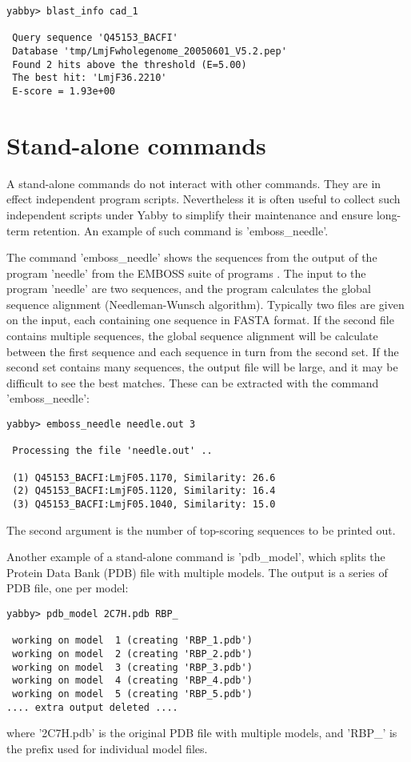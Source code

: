 \begin{verbatim}
yabby> blast_info cad_1

 Query sequence 'Q45153_BACFI'
 Database 'tmp/LmjFwholegenome_20050601_V5.2.pep'
 Found 2 hits above the threshold (E=5.00)
 The best hit: 'LmjF36.2210'
 E-score = 1.93e+00
\end{verbatim}

\section{Stand-alone commands}

A stand-alone commands do not interact with other commands. They
are in effect independent program scripts.  Nevertheless it is
often useful to collect such independent scripts under Yabby
to simplify their maintenance and ensure long-term retention.
An example of such command is 'emboss\_needle'.


The command 'emboss\_needle' shows the sequences from the output
of the program 'needle' from the EMBOSS suite of programs
\cite{emboss}. The input to the program 'needle' are two
sequences, and the program calculates the global sequence
alignment (Needleman-Wunsch algorithm). Typically two files
are given on the input, each containing one sequence in FASTA  
format. If the second file contains multiple sequences,
the global sequence alignment will be calculate between
the first sequence and each sequence in turn from the
second set. If the second set contains many sequences, the
output file will be large, and it may be difficult to see
the best matches. These can be extracted with the command
'emboss\_needle':

\begin{verbatim}
yabby> emboss_needle needle.out 3

 Processing the file 'needle.out' ..

 (1) Q45153_BACFI:LmjF05.1170, Similarity: 26.6
 (2) Q45153_BACFI:LmjF05.1120, Similarity: 16.4
 (3) Q45153_BACFI:LmjF05.1040, Similarity: 15.0
\end{verbatim}

The second argument is the number of top-scoring sequences
to be printed out.


Another example of a stand-alone command is 'pdb\_model', which 
splits the Protein Data Bank (PDB) file with multiple models.
The output is a series of PDB file, one per model:

\begin{verbatim}
yabby> pdb_model 2C7H.pdb RBP_

 working on model  1 (creating 'RBP_1.pdb')
 working on model  2 (creating 'RBP_2.pdb')
 working on model  3 (creating 'RBP_3.pdb')
 working on model  4 (creating 'RBP_4.pdb')
 working on model  5 (creating 'RBP_5.pdb')
.... extra output deleted ....
\end{verbatim}

where '2C7H.pdb' is the original PDB file with multiple models,
and 'RBP\_' is the prefix used for individual model files.

